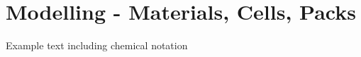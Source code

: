 \section{Modelling - Materials, Cells, Packs}\label{sec:modelling}

{\color{green} Example text including chemical notation\cite{Schlueter2018} }